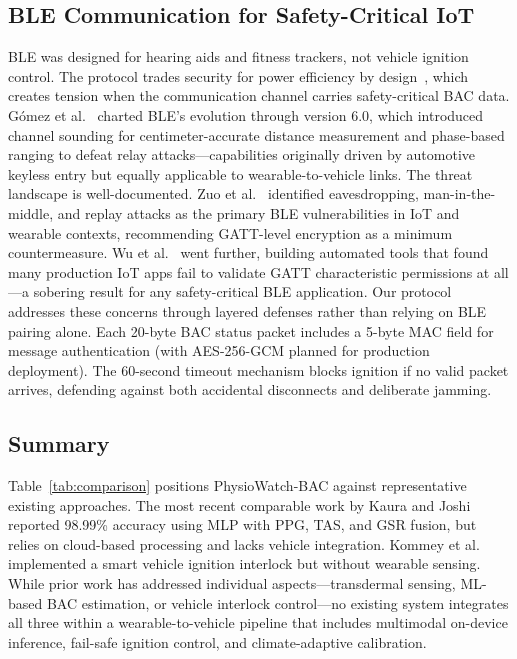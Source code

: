 \documentclass[HARVARD,Times2COL]{WileyNJDv5}
\begin{document}
\subsection{BLE Communication for Safety-Critical IoT}
BLE was designed for hearing aids and fitness trackers, not vehicle ignition control. The protocol trades security for power efficiency by design~\citep{lonzetta2018}, which creates tension when the communication channel carries safety-critical BAC data. G{\'o}mez et al.~\citep{gomez2025} charted BLE's evolution through version 6.0, which introduced channel sounding for centimeter-accurate distance measurement and phase-based ranging to defeat relay attacks---capabilities originally driven by automotive keyless entry but equally applicable to wearable-to-vehicle links.
The threat landscape is well-documented. Zuo et al.~\citep{zuo2022} identified eavesdropping, man-in-the-middle, and replay attacks as the primary BLE vulnerabilities in IoT and wearable contexts, recommending GATT-level encryption as a minimum countermeasure. Wu et al.~\citep{wu2023bleguide} went further, building automated tools that found many production IoT apps fail to validate GATT characteristic permissions at all---a sobering result for any safety-critical BLE application.
Our protocol addresses these concerns through layered defenses rather than relying on BLE pairing alone. Each 20-byte BAC status packet includes a 5-byte MAC field for message authentication (with AES-256-GCM planned for production deployment). The 60-second timeout mechanism blocks ignition if no valid packet arrives, defending against both accidental disconnects and deliberate jamming.

\subsection{Summary}
Table~\ref{tab:comparison} positions PhysioWatch-BAC against representative existing approaches. The most recent comparable work by Kaura and Joshi~\citep{kaura2025} reported 98.99\% accuracy using MLP with PPG, TAS, and GSR fusion, but relies on cloud-based processing and lacks vehicle integration. Kommey et al.~\citep{kommey2022} implemented a smart vehicle ignition interlock but without wearable sensing. While prior work has addressed individual aspects---transdermal sensing, ML-based BAC estimation, or vehicle interlock control---no existing system integrates all three within a wearable-to-vehicle pipeline that includes multimodal on-device inference, fail-safe ignition control, and climate-adaptive calibration.
\end{document}
